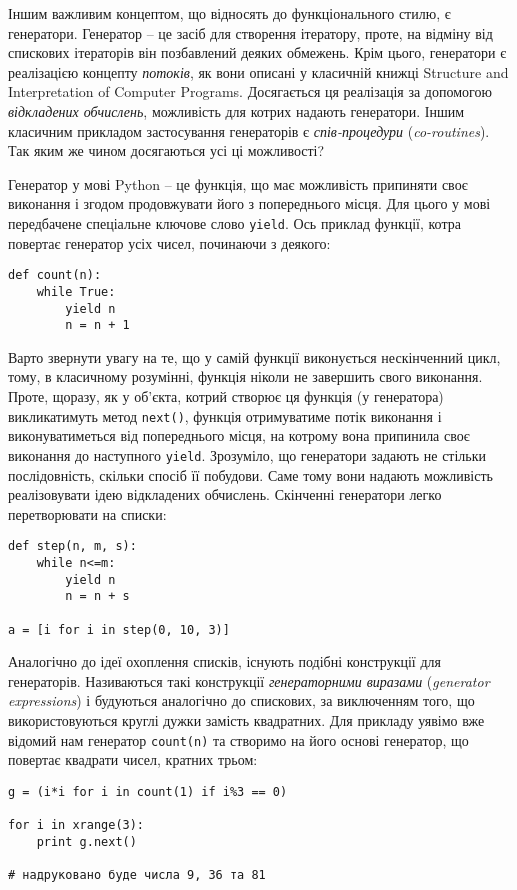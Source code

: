 \documentclass[a4paper, 12pt, onsedie]{article}
\begin{document}
Іншим важливим концептом, що відносять до функціонального стилю, є генератори. 
Генератор -- це засіб для створення ітератору, проте, на відміну від спискових
ітераторів він позбавлений деяких обмежень. Крім цього, генератори є реалізацією
концепту \emph{потоків}, як вони описані у класичній книжці Structure and 
Interpretation of Computer Programs. Досягається ця реалізація за допомогою
\emph{відкладених обчислень}, можливість для котрих надають генератори. Іншим
класичним прикладом застосування генераторів є \emph{спів-процедури} 
(\emph{co-routines}). Так яким же чином досягаються усі ці можливості?

Генератор у мові Python -- це функція, що має можливість припиняти своє виконання
і згодом продовжувати його з попереднього місця. Для цього у мові передбачене 
спеціальне ключове слово \texttt{yield}. Ось приклад функції, котра повертає 
генератор усіх чисел, починаючи з деякого:
\begin{verbatim}
def count(n):
    while True:
        yield n
        n = n + 1
\end{verbatim}
Варто звернути увагу на те, що у самій функції виконується нескінченний цикл, тому,
в класичному розумінні, функція ніколи не завершить свого виконання. Проте, щоразу,
як у об'єкта, котрий створює ця функція (у генератора) викликатимуть метод 
\texttt{next()}, функція отримуватиме потік виконання і виконуватиметься від 
попереднього місця, на котрому вона припинила своє виконання до наступного 
\texttt{yield}. Зрозуміло, що генератори задають не стільки послідовність, скільки
спосіб її побудови. Саме тому вони надають можливість реалізовувати ідею відкладених
обчислень. Скінченні генератори легко перетворювати на списки:
\begin{verbatim}
def step(n, m, s):
    while n<=m:
        yield n
        n = n + s

a = [i for i in step(0, 10, 3)]
\end{verbatim}

Аналогічно до ідеї охоплення списків, існують подібні конструкції для
генераторів. Називаються такі конструкції \emph{генераторними виразами} 
(\emph{generator expressions}) і будуються аналогічно до спискових, за
виключенням того, що використовуються круглі дужки замість квадратних.
Для прикладу уявімо вже відомий нам генератор \texttt{count(n)} та 
створимо на його основі генератор, що повертає квадрати чисел, кратних
трьом:
\begin{verbatim}
g = (i*i for i in count(1) if i%3 == 0)

for i in xrange(3): 
    print g.next()

# надруковано буде числа 9, 36 та 81
\end{verbatim}
\end{document}
